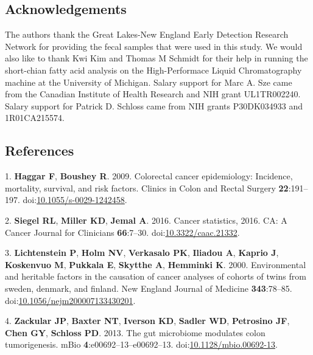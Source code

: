 \documentclass[11pt,]{article}
\begin{document}
\newpage

\subsection{Acknowledgements}\label{acknowledgements}

The authors thank the Great Lakes-New England Early Detection Research
Network for providing the fecal samples that were used in this study. We
would also like to thank Kwi Kim and Thomas M Schmidt for their help in
running the short-chian fatty acid analysis on the High-Performace
Liquid Chromatography machine at the University of Michigan. Salary
support for Marc A. Sze came from the Canadian Institute of Health
Research and NIH grant UL1TR002240. Salary support for Patrick D.
Schloss came from NIH grants P30DK034933 and 1R01CA215574.

\newpage

\subsection{References}\label{references}

\hypertarget{refs}{}
\hypertarget{ref-Haggar2009}{}
1. \textbf{Haggar F}, \textbf{Boushey R}. 2009. Colorectal cancer
epidemiology: Incidence, mortality, survival, and risk factors. Clinics
in Colon and Rectal Surgery \textbf{22}:191--197.
doi:\href{https://doi.org/10.1055/s-0029-1242458}{10.1055/s-0029-1242458}.

\hypertarget{ref-Siegel2016}{}
2. \textbf{Siegel RL}, \textbf{Miller KD}, \textbf{Jemal A}. 2016.
Cancer statistics, 2016. CA: A Cancer Journal for Clinicians
\textbf{66}:7--30.
doi:\href{https://doi.org/10.3322/caac.21332}{10.3322/caac.21332}.

\hypertarget{ref-Lichtenstein2000}{}
3. \textbf{Lichtenstein P}, \textbf{Holm NV}, \textbf{Verkasalo PK},
\textbf{Iliadou A}, \textbf{Kaprio J}, \textbf{Koskenvuo M},
\textbf{Pukkala E}, \textbf{Skytthe A}, \textbf{Hemminki K}. 2000.
Environmental and heritable factors in the causation of cancer analyses
of cohorts of twins from sweden, denmark, and finland. New England
Journal of Medicine \textbf{343}:78--85.
doi:\href{https://doi.org/10.1056/nejm200007133430201}{10.1056/nejm200007133430201}.

\hypertarget{ref-Zackular2013}{}
4. \textbf{Zackular JP}, \textbf{Baxter NT}, \textbf{Iverson KD},
\textbf{Sadler WD}, \textbf{Petrosino JF}, \textbf{Chen GY},
\textbf{Schloss PD}. 2013. The gut microbiome modulates colon
tumorigenesis. mBio \textbf{4}:e00692--13--e00692--13.
doi:\href{https://doi.org/10.1128/mbio.00692-13}{10.1128/mbio.00692-13}.
\end{document}
